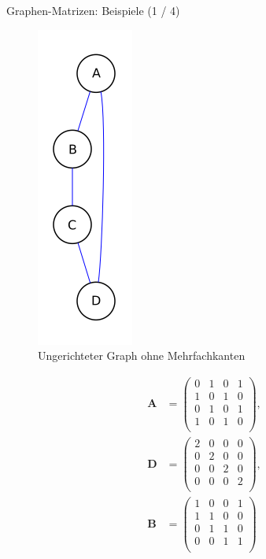 \documentclass[aspectratio=169]{beamer}
\begin{document}
\begin{frame}{Graphen-Matrizen: Beispiele (1 / 4)}

    \begin{multicols*}{2}
        
        \begin{figure}[H]
            \centering
            \includegraphics[height = 0.6 \textheight]{120px-Graph_ungerichtet.svg.png}
            \caption{Ungerichteter Graph ohne Mehrfachkanten}
        \end{figure}

        \begin{align*}
            \mathbf A
            & =
            \begin{pmatrix}
                0 & 1 & 0 & 1 \\
                1 & 0 & 1 & 0 \\
                0 & 1 & 0 & 1 \\
                1 & 0 & 1 & 0 \\
            \end{pmatrix}, \\
            \mathbf D
            & =
            \begin{pmatrix}
                2 & 0 & 0 & 0 \\
                0 & 2 & 0 & 0 \\
                0 & 0 & 2 & 0 \\
                0 & 0 & 0 & 2 \\
            \end{pmatrix}, \\
            \mathbf B
            & =
            \begin{pmatrix}
                1 & 0 & 0 & 1 \\
                1 & 1 & 0 & 0 \\
                0 & 1 & 1 & 0 \\
                0 & 0 & 1 & 1 \\
            \end{pmatrix}
        \end{align*}


\end{multicols*}
\end{frame}
\end{document}

